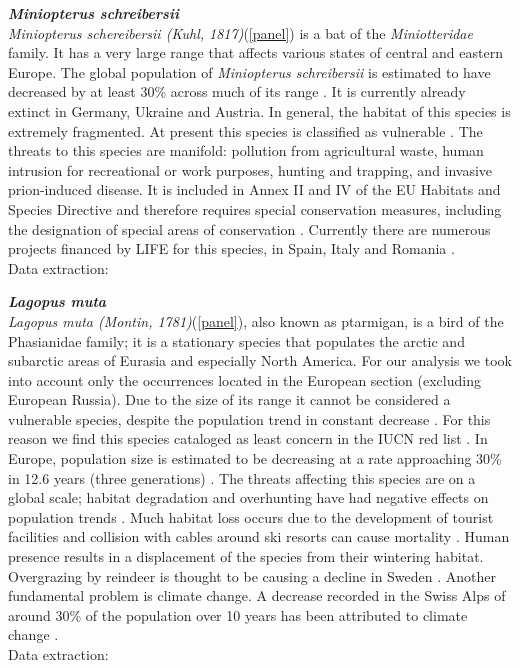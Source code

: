 \documentclass[12pt,a4paper]{article}
\begin{document}
\bigskip
{\noindent \textbf{\textit{Miniopterus schreibersii}}} 
\\
\textit{Miniopterus schereibersii (Kuhl, 1817)}(\ref{panel}) is a bat of the \textit{Miniotteridae} family.
It has a very large range that affects various states of central and eastern Europe.
The global population of \textit{Miniopterus schreibersii} is estimated to have decreased by at least 30\% across much of its range \citep{IUCN}. It is currently already extinct in Germany, Ukraine and Austria. In general, the habitat of this species is extremely fragmented. At present this species is classified as vulnerable \citep{IUCN}.
The threats to this species are manifold: pollution from agricultural waste, human intrusion for recreational or work purposes, hunting and trapping, and invasive prion-induced disease.
It is included in Annex II and IV of the EU Habitats and Species Directive and therefore requires special conservation measures, including the designation of special areas of conservation \citep{dir}.
Currently there are numerous projects financed by LIFE for this species, in Spain, Italy and Romania \citep{IUCN}.\\
Data extraction: \citep{minio}

\bigskip
{\noindent \textbf{\textit{Lagopus muta}}} 
\\
\textit{Lagopus muta (Montin, 1781)}(\ref{panel}), also known as ptarmigan, is a bird of the Phasianidae family; it is a stationary species that populates the arctic and subarctic areas of Eurasia and especially North America. For our analysis we took into account only the occurrences located in the European section (excluding European Russia).
Due to the size of its range it cannot be considered a vulnerable species, despite the population trend in constant decrease \citep{IUCN}.
For this reason we find this species cataloged as least concern in the IUCN red list \citep{IUCN}.
In Europe, population size is estimated to be decreasing at a rate approaching 30\% in 12.6 years (three generations) \citep{bird}.
The threats affecting this species are on a global scale; habitat degradation and overhunting have had negative effects on population trends \citep{mad}. Much habitat loss occurs due to the development of tourist facilities and collision with cables around ski resorts can cause mortality \citep{IUCN}.
Human presence results in a displacement of the species from their wintering habitat. Overgrazing by reindeer is thought to be causing a decline in Sweden \citep{sto}.
Another fundamental problem is climate change.
A decrease recorded in the Swiss Alps of around 30\% of the population over 10 years has been attributed to climate change \citep{de}.\\
Data extraction: \citep{pernice}
\end{document}
